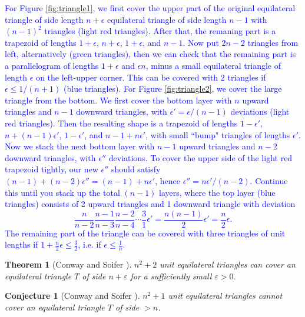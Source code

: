 \documentclass[a4paper]{amsart}
\theoremstyle{plain}
\newtheorem{theorem}{Theorem}
\newtheorem{conjecture}{Conjecture}
\theoremstyle{definition}
\begin{document}
\textcolor{blue}{
For Figure \ref{fig:triangle1}, we first cover the upper part of the original equilateral triangle of side length $n+\epsilon$ equilateral triangle of side length $n-1$ with $(n-1)^2$ triangles (light red triangles). After that, the remaning part is a trapezoid of lengths $1+\epsilon$, $n+\epsilon$, $1+\epsilon$, and $n-1$. Now put $2n-2$ triangles from left, alternatively (green triangles), then we can check that the remaining part is a parallelogram of lengths $1+\epsilon$ and $\epsilon n$, minus a small equilateral triangle of length $\epsilon$ on the left-upper corner.
This can be covered with 2 triangles if $\epsilon \leq 1 / (n + 1)$ (blue triangles).
\newline
For Figure \ref{fig:triangle2}, we cover the large triangle from the bottom. We first cover the bottom layer with $n$ upward triangles and $n-1$ downward triangles, with $\epsilon' = \epsilon / (n-1)$ deviations (light red triangles). Then the resulting shape is a trapezoid of lengths $1 - \epsilon'$, $n +(n-1)\epsilon'$, $1 - \epsilon'$, and $n - 1 + n\epsilon'$, with small ``bump" triangles of lengths $\epsilon'$. Now we stack the next bottom layer with $n-1$ upward triangles and $n-2$ downward triangles, with $\epsilon''$ deviations. To cover the upper side of the light red trapezoid tightly, our new $\epsilon''$ should satisfy $(n-1) + (n-2)\epsilon'' = (n-1) + n\epsilon'$, hence $\epsilon'' = n\epsilon' / (n-2)$. Continue this until you stack up the total $(n-1)$ layers, where the top layer (blue triangles) consists of 2 upward triangles and 1 downward triangle with deviation
$$
\frac{n}{n-2} \frac{n-1}{n-3} \frac{n-2}{n-4} \cdots \frac{3}{1} \epsilon' = \frac{n(n-1)}{2} \epsilon' = \frac{n}{2} \epsilon.
$$
The remaining part of the triangle can be covered with three triangles of unit lengths if $1 + \frac{n}{2}\epsilon \le \frac{3}{2}$, i.e. if $\epsilon \leq \frac{1}{n}$.
}


\begin{theorem}[Conway and Soifer \cite{conway2004coverup, conway2005covering}]
\label{thm:main-prev}
$n^2 + 2$ unit equilateral triangles can cover an equilateral triangle $T$ of side $n + \varepsilon$ for a sufficiently small $\varepsilon > 0$.
\end{theorem}

\begin{conjecture}[Conway and Soifer \cite{conway2004coverup}]
\label{conj:main}
$n^2 + 1$ unit equilateral triangles cannot cover an equilateral triangle $T$ of side $> n$.
\end{conjecture}
\end{document}
